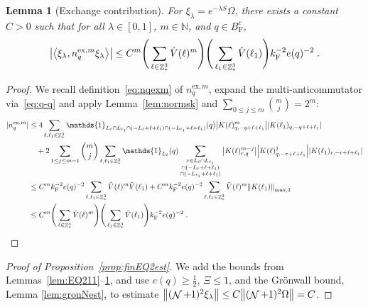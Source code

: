 \documentclass[12pt,a4paper]{article}
\numberwithin{equation}{section}
\newcommand{\NNN}{\mathbb{N}}
\newcommand{\1}{\mathbb{I}}
\newcommand{\ex}{\mathrm{ex}}
\newcommand{\F}{\mathrm{F}}
\DeclareMathOperator{\Z}{\mathbb{Z}}
\DeclareMathOperator{\NN}{\mathcal{N}}
\newcommand{\half}{\frac{1}{2}}
\newcommand{\eva}[1]{\left\langle #1 \right\rangle}
\theoremstyle{plain}
\newtheorem{lemma}[theorem]{Lemma}
\theoremstyle{definition}
\theoremstyle{remark}
\theoremstyle{plain}
\theoremstyle{definition}
\theoremstyle{remark}
\begin{document}
\begin{lemma}[Exchange contribution] \label{lem:estnqex}
For $\xi_\lambda = e^{-\lambda S} \Omega$, there exists a constant $ C > 0 $ such that for all $ \lambda \in [0,1] $, $ m \in \NNN $, and $ q \in B_{\F}^c $,
\begin{equation}
	\abs{\eva{\xi_\lambda, n_q^{\ex,m} \xi_\lambda }}
	\leq C^m \Bigg( \sum_{\ell \in \Z^3_*} \hat{V}(\ell)^m \Bigg)
		\Bigg( \sum_{\ell_1 \in \Z^3_*} \hat{V}(\ell_1) \Bigg)
		k_{\F}^{-2} e(q)^{-2} \;. \label{eq:estnqex}
\end{equation}
\end{lemma}

\begin{proof}
We recall definition~\eqref{eq:nqexm} of $ n_q^{\ex,m} $, expand the multi-anticommutator via~\eqref{eq:q-q} and apply Lemma~\ref{lem:normsk} and $ \sum_{0 \le j \le m} {{m}\choose j} = 2^m $:
\begin{equation}
\begin{aligned}
	|n_q^{\ex,m}|
	&\leq 4 \sum_{\ell,\ell_1 \in \Z^3_*}
		\mathds{1}_{L_\ell \cap L_{\ell_1} \cap (-L_\ell + \ell + \ell_1) \cap (-L_{\ell_1} + \ell + \ell_1)}(q)
		\abs{K(\ell)^m_{q,-q+\ell+\ell_1}}
		\abs{K(\ell_1)_{q,-q+\ell+\ell_1}} \\
		&\quad + 2 \sum_{1 \le j \le m-1} {{m}\choose j} \sum_{\ell,\ell_1 \in \Z^3_*}
		\mathds{1}_{L_\ell}(q)
		\sum_{\substack{r\in L_{\ell} \cap L_{\ell_1}\\ \cap (-L_{\ell}+\ell+\ell_1) \\ \cap (-L_{\ell_1}+\ell+\ell_1 )}}
		\abs{K(\ell)^{m-j}_{r,q}}
		\abs{K(\ell)^j_{q,-r+\ell+\ell_1}}
		\abs{K(\ell_1)_{r,-r+\ell+\ell_1}} \\
	&\leq C^m k_{\F}^{-2} e(q)^{-2} \sum_{\ell,\ell_1 \in \Z^3_*}
		\hat{V}(\ell)^m
		\hat{V}(\ell_1)
	+ C^m k_{\F}^{-2} e(q)^{-2} \sum_{\ell,\ell_1 \in \Z^3_*}
		\hat{V}(\ell)^m
		\norm{K(\ell_1)}_{\max,1} \\
	&\leq C^m
		\Bigg( \sum_{\ell \in \Z^3_*} \hat{V}(\ell)^m \Bigg)
		\Bigg( \sum_{\ell_1 \in \Z^3_*} \hat{V}(\ell_1) \Bigg)
		k_{\F}^{-2} e(q)^{-2} \;.
\end{aligned}
\end{equation}

\end{proof}



\begin{proof}[Proof of Proposition~\ref{prop:finEQ2est}]
We add the bounds from Lemmas~\ref{lem:EQ211}--\ref{lem:estnqex}, and use $ e(q) \ge \half $, $ \Xi \le 1 $, and the Gr\"onwall bound, Lemma \ref{lem:gronNest}, to estimate $ \norm{(\NN+1)^2 \xi_\lambda} \le C \norm{(\NN+1)^2 \Omega} = C $.
\end{proof}
\end{document}
